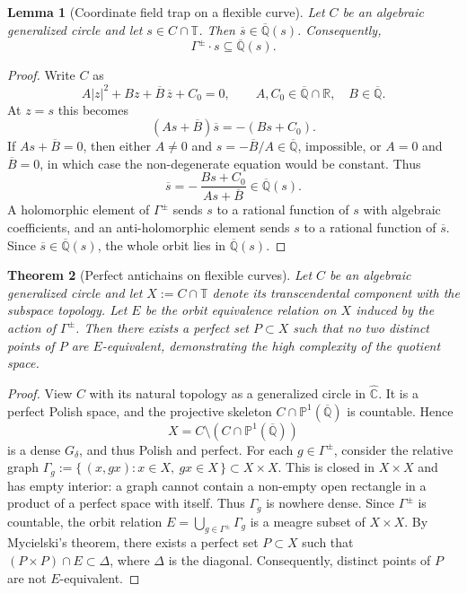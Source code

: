 \documentclass[11pt,a4paper]{article}
\theoremstyle{plain}
\newtheorem{theorem}{Theorem}[section]
\newtheorem{lemma}[theorem]{Lemma}
\theoremstyle{definition}
\newcommand{\R}{\mathbb{R}}
\newcommand{\rsphere}{\hat{\mathbb{C}}}
\newcommand{\Alg}{\overline{\mathbb{Q}}}
\newcommand{\PAlg}{\mathbb{P}^{1}(\Alg)}
\newcommand{\trans}{\mathbb{T}}
\newcommand{\Tc}{\trans}
\begin{document}
\begin{lemma}[Coordinate field trap on a flexible curve]\label{lem:coordinate-field-trap}
	Let $C$ be an algebraic generalized circle and let $s\in C\cap\Tc$. Then $\overline{s}\in\Alg(s)$. Consequently,
	\[
		\Gamma^{\pm}\cdot s\subseteq \Alg(s).
	\]
\end{lemma}
\begin{proof}
	Write $C$ as
	\[
		A|z|^2+Bz+\overline B\,\overline z+C_0=0,
		\qquad A,C_0\in\Alg\cap\R,\quad B\in\Alg.
	\]
	At $z=s$ this becomes
	\[
		(A s+\overline B)\overline{s}=-(Bs+C_0).
	\]
	If $A s+\overline B=0$, then either $A\ne0$ and $s=-\overline B/A\in\Alg$, impossible, or $A=0$ and $\overline B=0$, in which case the non-degenerate equation would be constant. Thus
	\[
		\overline{s}=-\,\frac{Bs+C_0}{A s+\overline B}\in\Alg(s).
	\]
	A holomorphic element of $\Gamma^{\pm}$ sends $s$ to a rational function of $s$ with algebraic coefficients, and an anti-holomorphic element sends $s$ to a rational function of $\overline s$. Since $\overline s\in\Alg(s)$, the whole orbit lies in $\Alg(s)$.
\end{proof}

\begin{theorem}[Perfect antichains on flexible curves]\label{thm:perfect-antichain}
	Let $C$ be an algebraic generalized circle and let $X:=C\cap\Tc$ denote its transcendental component with the subspace topology. Let $E$ be the orbit equivalence relation on $X$ induced by the action of $\Gamma^{\pm}$. Then there exists a perfect set $P\subset X$ such that no two distinct points of $P$ are $E$-equivalent, demonstrating the high complexity of the quotient space.
\end{theorem}
\begin{proof}
	View $C$ with its natural topology as a generalized circle in $\rsphere$. It is a perfect Polish space, and the projective skeleton $C\cap\PAlg$ is countable. Hence
	\[
		X=C\setminus(C\cap\PAlg)
	\]
	is a dense $G_\delta$, and thus Polish and perfect. For each $g\in\Gamma^{\pm}$, consider the relative graph
	\(
	\Gamma_g:=\{\,(x,gx):x\in X,\ gx\in X\,\}\subset X\times X.
	\)
	This is closed in $X\times X$ and has empty interior: a graph cannot contain a non-empty open rectangle in a product of a perfect space with itself. Thus $\Gamma_g$ is nowhere dense. Since $\Gamma^{\pm}$ is countable, the orbit relation $E=\bigcup_{g\in\Gamma^{\pm}}\Gamma_g$ is a meagre subset of $X\times X$. By Mycielski’s theorem, there exists a perfect set $P\subset X$ such that $(P\times P)\cap E\subset\Delta$, where $\Delta$ is the diagonal. Consequently, distinct points of $P$ are not $E$-equivalent.
\end{proof}
\end{document}
